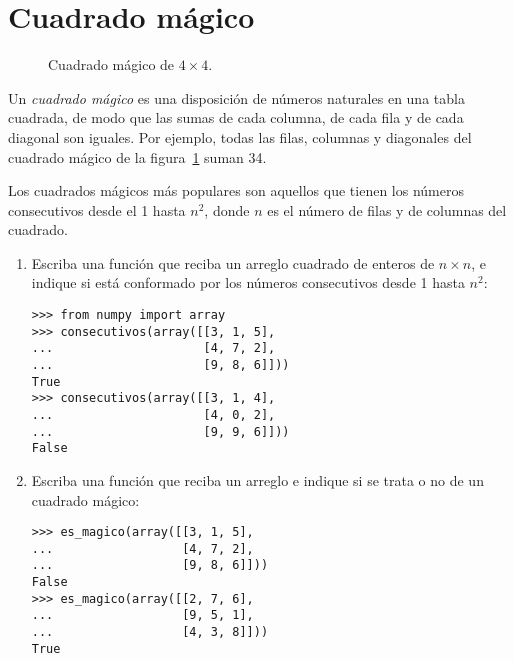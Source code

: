 \section{Cuadrado mágico}

\begin{figure}
  \centering
  
  \caption{Cuadrado mágico de \(4\times 4\).}
  \label{fig:magico}
\end{figure}

Un \emph{cuadrado mágico} es una disposición de números naturales en una
tabla cuadrada, de modo que las sumas de cada columna, de cada fila y de
cada diagonal son iguales.
Por ejemplo, todas las filas, columnas y diagonales
del cuadrado mágico de la figura~\ref{fig:magico} suman 34.


Los cuadrados mágicos más populares son aquellos que tienen los números
consecutivos desde el 1 hasta \(n^2\), donde \(n\) es el número de filas
y de columnas del cuadrado.

\begin{enumerate}
\item
  Escriba una función que reciba un arreglo cuadrado de enteros de
  \(n \times n\), e indique si está conformado por los números consecutivos
  desde 1 hasta \(n^2\):

\begin{lstlisting}
>>> from numpy import array
>>> consecutivos(array([[3, 1, 5],
...                     [4, 7, 2],
...                     [9, 8, 6]]))
True
>>> consecutivos(array([[3, 1, 4],
...                     [4, 0, 2],
...                     [9, 9, 6]]))
False
\end{lstlisting}
\item
  Escriba una función que reciba un arreglo e indique si se trata o no
  de un cuadrado mágico:

\begin{lstlisting}
>>> es_magico(array([[3, 1, 5],
...                  [4, 7, 2],
...                  [9, 8, 6]]))
False
>>> es_magico(array([[2, 7, 6],
...                  [9, 5, 1],
...                  [4, 3, 8]]))
True
\end{lstlisting}
\end{enumerate}
